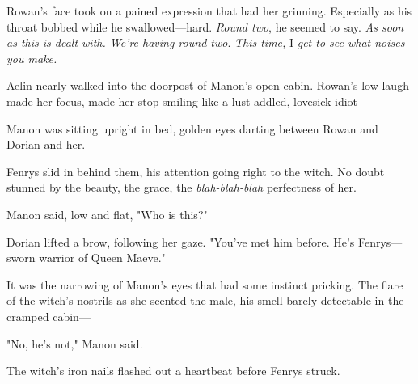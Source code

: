 Rowan's face took on a pained expression that had her grinning.
Especially as his throat bobbed while he swallowed---hard.
\emph{Round two}, he seemed to say.
\emph{As soon as this is dealt with.
We're having round two}.
\emph{This time,} I \emph{get to see what noises you make.}

Aelin nearly walked into the doorpost of Manon's open cabin.
Rowan's low laugh made her focus, made her stop smiling like a lust-addled, lovesick idiot---

Manon was sitting upright in bed, golden eyes darting between Rowan and Dorian and her.

Fenrys slid in behind them, his attention going right to the witch.
No doubt stunned by the beauty, the grace, the \emph{blah-blah-blah}
perfectness of her.

Manon said, low and flat, "Who is this?"

Dorian lifted a brow, following her gaze.
"You've met him before.
He's Fenrys---sworn warrior of Queen Maeve."

It was the narrowing of Manon's eyes that had some instinct pricking.
The flare of the witch's nostrils as she scented the male, his smell barely detectable in the cramped cabin---

"No, he's not," Manon said.

The witch's iron nails flashed out a heartbeat before Fenrys struck.
